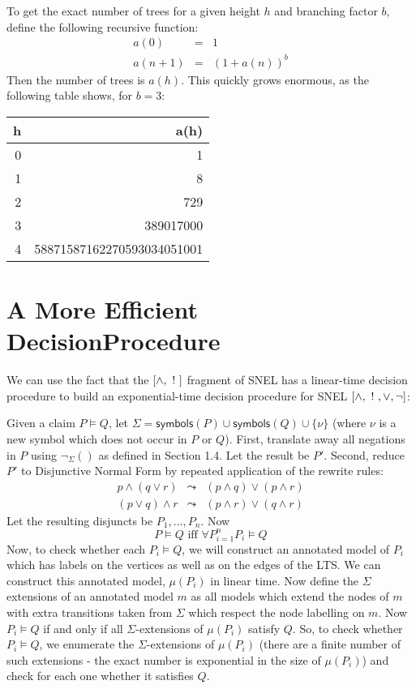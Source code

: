 To get the exact number of trees for a given height $h$ and branching factor $b$, define the following recursive function:
\begin{eqnarray}
a(0) & = & 1\nonumber \\
a(n+1) & = & (1+a(n))^b \nonumber
\end{eqnarray}
Then the number of trees is $a(h)$.
This quickly grows enormous, as the following table shows, for $b = 3$:
\begin{center}
\begin{tabular}{ r | r }
h & a(h) \\
\hline
0 & 1 \\
1 & 8 \\
2 & 729 \\
3 & 389017000 \\
4 & 58871587162270593034051001
\end{tabular}
\end{center}
    
\section{A More Efficient DecisionProcedure}
We can use the fact that the $[\land, \ ! \ ]$ fragment of SNEL has a linear-time decision procedure to build an exponential-time decision procedure for SNEL $[\land, \ ! \ , \lor ,\neg]$:

Given a claim $P \models Q$, let $\Sigma = \mathsf{symbols}(P) \cup \mathsf{symbols}(Q) \cup \{\nu\}$ (where $\nu$ is a new symbol which does not occur in $P$ or $Q$).
First, translate away all negations in $P$ using $\neg_\Sigma()$ as defined in Section 1.4.
Let the result be $P'$.
Second, reduce $P'$ to Disjunctive Normal Form by repeated application of the rewrite rules:
\begin{eqnarray}
p \land (q \lor r) & \leadsto & (p \land q) \lor (p \land r) \nonumber \\
(p \lor q) \land r & \leadsto & (p \land r) \lor (q \land r) \nonumber
\end{eqnarray}
Let the resulting disjuncts be $P_1, ..., P_n$. 
Now 
\[
P \models Q \mbox{ iff } \forall P_{i=1}^n P_i \models Q
\]
Now, to check whether each $P_i \models Q$, we will construct an annotated model of $P_i$ which has labels on the vertices as well as on the edges of the LTS. We can construct this annotated model, $\mu(P_i)$ in linear time. 
Now define the $\Sigma$ extensions of an annotated model $m$ as all models which extend the nodes of $m$ with extra transitions taken from $\Sigma$ which respect the node labelling on $m$.
Now $P_i \models Q$ if and only if all $\Sigma$-extensions of $\mu(P_i)$ satisfy $Q$.
So, to check whether $P_i \models Q$, we enumerate the $\Sigma$-extensions of $\mu(P_i)$ (there are a finite number of such extensions - the exact number is exponential in the size of $\mu(P_i)$) and check for each one whether it satisfies $Q$.

